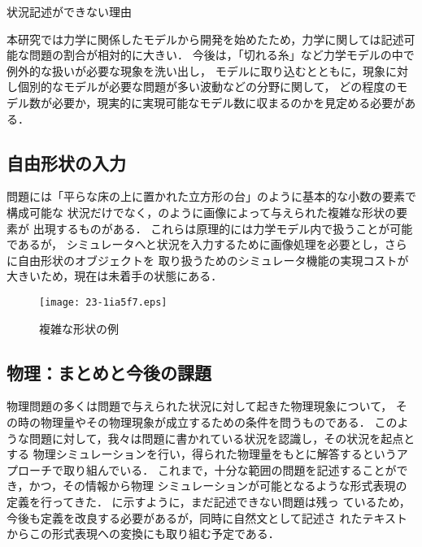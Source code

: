 \documentclass[japanese]{jnlp_1.4b}
\def\FIGREF#1{}
\def\TABREF#1{}
\begin{document}
\begin{table}[b]
\caption{状況記述ができない理由}
\label{tab:butsuri:riyuu}

\end{table}

  本研究では力学に関係したモデルから開発を始めたため，力学に関しては記述可能な問題の割合が相対的に大きい．
  今後は，「切れる糸」など力学モデルの中で例外的な扱いが必要な現象を洗い出し，
  モデルに取り込むとともに，現象に対し個別的なモデルが必要な問題が多い波動などの分野に関して，
  どの程度のモデル数が必要か，現実的に実現可能なモデル数に収まるのかを見定める必要がある．


  \subsection{自由形状の入力}

  問題には「平らな床の上に置かれた立方形の台」のように基本的な小数の要素で構成可能な
  状況だけでなく，\FIGREF{fig:butsuri:fig1}のように画像によって与えられた複雑な形状の要素が
  出現するものがある．
  これらは原理的には力学モデル内で扱うことが可能であるが，
  シミュレータへと状況を入力するために画像処理を必要とし，さらに自由形状のオブジェクトを
  取り扱うためのシミュレータ機能の実現コストが大きいため，現在は未着手の状態にある．
  
\begin{figure}[b]
\begin{center}
\texttt{[image: 23-1ia5f7.eps]}
\end{center}
\caption{複雑な形状の例}
\label{fig:butsuri:fig1}
\end{figure}


  \subsection{物理：まとめと今後の課題}

  物理問題の多くは問題で与えられた状況に対して起きた物理現象について，
  その時の物理量やその物理現象が成立するための条件を問うものである．
  このような問題に対して，我々は問題に書かれている状況を認識し，その状況を起点とする
  物理シミュレーションを行い，得られた物理量をもとに解答するというアプローチで取り組んでいる．
  これまで，十分な範囲の問題を記述することができ，かつ，その情報から物理
  シミュレーションが可能となるような形式表現の定義を行ってきた．
  \TABREF{fig:butsuri:mondaibunrui}に示すように，まだ記述できない問題は残っ
  ているため，今後も定義を改良する必要があるが，同時に自然文として記述さ
  れたテキストからこの形式表現への変換にも取り組む予定である．
\end{document}
